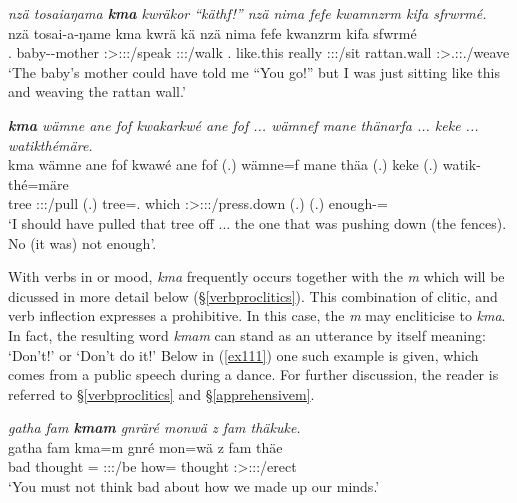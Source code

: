 \begin{exe}
	\ex \emph{nzä tosaiaŋama \textbf{kma} kwräkor ``käthf!'' nzä nima fefe kwamnzrm kifa sfrwrmé.}\\
	\gll nzä tosai-a-ŋame kma kwrä kä nzä nima fefe kwanzrm kifa sfwrmé\\
	\Fsg{}.\Abs{} baby-\Poss-mother \Pot{} \Stsg:\Sbj>\Fsg:\Obj:\Irr:\Pfv/speak \Ssg:\Sbj:\Imp:\Pfv/walk \Fsg{}.\Abs{} {like.this} really \Fsg:\Sbj:\Pst:\Dur/sit rattan.wall \Fsg:\Sbj>\Tsg.\Masc:\Obj:\Pst.\Dur/weave\\
	\trans `The baby's mother could have told me ``You go!'' but I was just sitting like this and weaving the rattan wall.'
	\label{ex109}
\end{exe}
\begin{exe}
	\ex \emph{\textbf{kma} wämne ane fof kwakarkwé ane fof ... wämnef mane thänarfa ... keke ... watikthémäre.}\\
	\gll kma wämne ane fof kwawé ane fof (.) wämne=f mane thäa (.) keke (.) watik-thé=märe\\
	\Pot{} tree \Dem{} \Emph{} \Fsg:\Sbj:\Rpst:\Ipfv/pull \Dem{} \Emph{} (.) tree=\Erg.\Sg{} which \Stsg:\Sbj>\Stpl:\Obj:\Pst:\Pfv/press.down (.) \Neg{} (.) enough-\Adlzr=\Priv{}\\
	\trans `I should have pulled that tree off ... the one that was pushing down (the fences). No (it was) not enough'.
	\label{ex110}
\end{exe}

With verbs in  or  mood, \emph{kma} frequently occurs together with the  \emph{m} which will be dicussed in more detail below (\S{}\ref{verbproclitics}). This combination of clitic,  and verb inflection expresses a prohibitive. In this case, the  \emph{m} may encliticise to \emph{kma}. In fact, the resulting word \emph{kmam} can stand as an utterance by itself meaning: `Don't!' or `Don't do it!' Below in (\ref{ex111}) one such example is given, which comes from a public speech during a dance. For further discussion, the reader is referred to \S{}\ref{verbproclitics} and \S{}\ref{apprehensivem}.

\begin{exe}
	\ex \emph{gatha fam \textbf{kmam} gnräré monwä z fam thäkuke.}\\
	\gll gatha fam kma=m gnré mon=wä z fam thäe\\
	bad thought \Pot{}=\Appr{} \Ssg:\Sbj:\Imp:\Ipfv/be how=\Emph{} \Iam{} thought \Fpl:\Sbj>\Stpl:\Obj:\Rpst:\Pfv/erect\\
	\trans `You must not think bad about how we made up our minds.'
	\label{ex111}
\end{exe}

